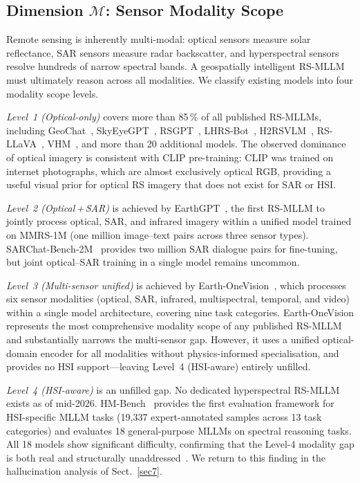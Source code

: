 \subsection{Dimension \texorpdfstring{$\mathcal{M}$}{M}: Sensor Modality Scope}\label{sec3:modality}

Remote sensing is inherently multi-modal: optical sensors measure solar reflectance,
SAR sensors measure radar backscatter, and hyperspectral sensors resolve hundreds of
narrow spectral bands. A geospatially intelligent RS-MLLM must ultimately reason across
all modalities. We classify existing models into four modality scope levels.

\textit{Level~1 (Optical-only)} covers more than 85\,\% of all published RS-MLLMs,
including GeoChat~\cite{geochat2024}, SkyEyeGPT~\cite{skyeyegpt2025},
RSGPT~\cite{rsgpt2023}, LHRS-Bot~\cite{lhrsbot2024}, H2RSVLM~\cite{h2rsvlm2025},
RS-LLaVA~\cite{rsllava2024}, VHM~\cite{vhm2025}, and more than 20 additional models.
The observed dominance of optical imagery is consistent with CLIP pre-training:
CLIP was trained on
internet photographs, which are almost exclusively optical RGB, providing a useful visual
prior for optical RS imagery that does not exist for SAR or HSI.

\textit{Level~2 (Optical\,+\,SAR)} is achieved by EarthGPT~\cite{earthgpt2025}, the
first RS-MLLM to jointly process optical, SAR, and infrared imagery within a unified
model trained on MMRS-1M (one million image--text pairs across three sensor types).
SARChat-Bench-2M~\cite{sarchatchat2025} provides two million SAR dialogue pairs for
fine-tuning, but joint optical--SAR training in a single model remains uncommon.

\textit{Level~3 (Multi-sensor unified)} is achieved by Earth-OneVision~\cite{earthonevision2026},
which processes six sensor modalities (optical, SAR, infrared, multispectral,
temporal, and video) within a single model architecture, covering nine task categories.
Earth-OneVision represents the most comprehensive modality scope of any published
RS-MLLM and substantially narrows the multi-sensor gap. However, it uses a
unified optical-domain encoder for all modalities without physics-informed
specialisation, and provides no HSI support---leaving Level~4 (HSI-aware)
entirely unfilled.

\textit{Level~4 (HSI-aware)} is an unfilled gap. No dedicated hyperspectral RS-MLLM
exists as of mid-2026. HM-Bench~\cite{hmbench2026} provides the first evaluation
framework for HSI-specific MLLM tasks (19,337 expert-annotated samples across 13 task
categories) and evaluates 18 general-purpose MLLMs on spectral reasoning tasks. All 18
models show significant difficulty, confirming that the Level-4 modality gap is both
real and structurally unaddressed~\cite{hmbench2026}. We return to this finding in the
hallucination analysis of Sect.~\ref{sec7}.

